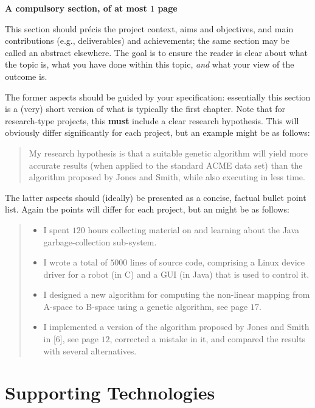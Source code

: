 \documentclass[ %
                    author={Tom Jager},
                supervisor={Dr. Daniel Schien},
                    degree={MEng},
                     title={A Bayesian Inference Engine for UMIS Structured Data},
                  subtitle={},
                      type={research},
                      year={2019} ]{dissertation}
\begin{document}
{\bf A compulsory section, of at most $1$ page} 
\vspace{1cm} 

\noindent
This section should pr\'{e}cis the project context, aims and objectives,
and main contributions (e.g., deliverables) and achievements; the same 
section may be called an abstract elsewhere.  The goal is to ensure the 
reader is clear about what the topic is, what you have done within this 
topic, {\em and} what your view of the outcome is.

The former aspects should be guided by your specification: essentially 
this section is a (very) short version of what is typically the first 
chapter.  Note that for research-type projects, this {\bf must} include 
a clear research hypothesis.  This will obviously differ significantly
for each project, but an example might be as follows:

\begin{quote}
My research hypothesis is that a suitable genetic algorithm will yield
more accurate results (when applied to the standard ACME data set) than 
the algorithm proposed by Jones and Smith, while also executing in less
time.
\end{quote}

\noindent
The latter aspects should (ideally) be presented as a concise, factual 
bullet point list.  Again the points will differ for each project, but 
an might be as follows:

\begin{quote}
\noindent
\begin{itemize}
\item I spent $120$ hours collecting material on and learning about the 
      Java garbage-collection sub-system. 
\item I wrote a total of $5000$ lines of source code, comprising a Linux 
      device driver for a robot (in C) and a GUI (in Java) that is 
      used to control it.
\item I designed a new algorithm for computing the non-linear mapping 
      from A-space to B-space using a genetic algorithm, see page $17$.
\item I implemented a version of the algorithm proposed by Jones and 
      Smith in [6], see page $12$, corrected a mistake in it, and 
      compared the results with several alternatives.
\end{itemize}
\end{quote}


\chapter*{Supporting Technologies}
\end{document}
